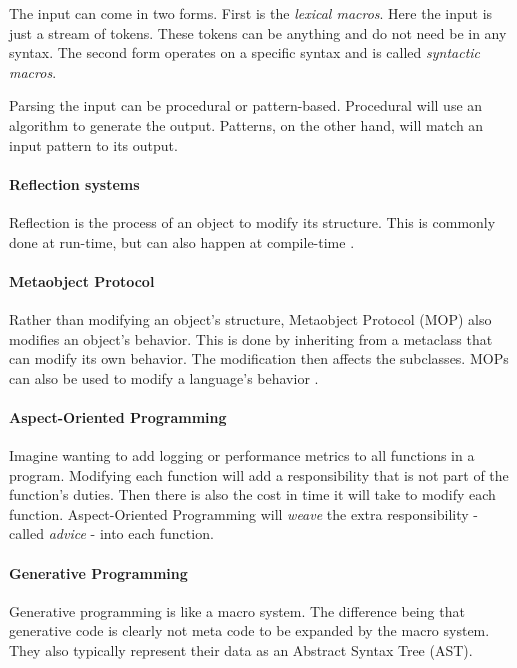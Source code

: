 The input can come in two forms.
First is the \textit{lexical macros}.
Here the input is just a stream of tokens.
These tokens can be anything and do not need be in any syntax.
The second form operates on a specific syntax and is called \textit{syntactic macros}.

Parsing the input can be procedural or pattern-based.
Procedural will use an algorithm to generate the output.
Patterns, on the other hand, will match an input pattern to its output.

\paragraph{Reflection systems}
Reflection is the process of an object to modify its structure.
This is commonly done at run-time, but can also happen at compile-time \cite{savidis_19_01}.

\paragraph{Metaobject Protocol}
Rather than modifying an object's structure, Metaobject Protocol (MOP) also modifies an object's behavior.
This is done by inheriting from a metaclass that can modify its own behavior.
The modification then affects the subclasses. \cite{lee_95_01, savidis_19_01}
MOPs can also be used to modify a language's behavior \cite{seaton_15_01}.

\paragraph{Aspect-Oriented Programming}
Imagine wanting to add logging or performance metrics to all functions in a program.
Modifying each function will add a responsibility that is not part of the function's duties.
Then there is also the cost in time it will take to modify each function.
Aspect-Oriented Programming will \textit{weave} the extra responsibility - called \textit{advice} - into each function. \cite{savidis_19_01}

\paragraph{Generative Programming}
Generative programming is like a macro system.
The difference being that generative code is clearly not meta code to be expanded by the macro system.
They also typically represent their data as an Abstract Syntax Tree (AST). \cite{savidis_19_01}

